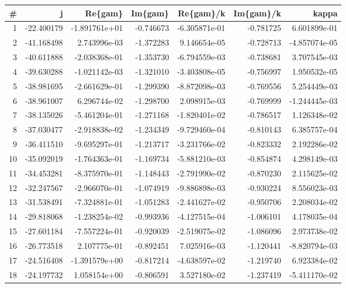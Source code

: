 \begin{tabular}{rrrrrrr}
\toprule
 \# &          j &       Re\{gam\} &   Im\{gam\} &     Re\{gam\}/k &  Im\{gam\}/k &         kappa \\
\midrule
 1 & -22.400179 & -1.891761e+01 & -0.746673 & -6.305871e-01 &  -0.781725 &  6.601899e-01 \\
 2 & -41.168498 &  2.743996e-03 & -1.372283 &  9.146654e-05 &  -0.728713 & -4.857074e-05 \\
 3 & -40.611888 & -2.038368e-01 & -1.353730 & -6.794559e-03 &  -0.738681 &  3.707545e-03 \\
 4 & -39.630288 & -1.021142e-03 & -1.321010 & -3.403808e-05 &  -0.756997 &  1.950532e-05 \\
 5 & -38.981695 & -2.661629e-01 & -1.299390 & -8.872098e-03 &  -0.769556 &  5.254449e-03 \\
 6 & -38.961007 &  6.296744e-02 & -1.298700 &  2.098915e-03 &  -0.769999 & -1.244445e-03 \\
 7 & -38.135026 & -5.461204e-01 & -1.271168 & -1.820401e-02 &  -0.786517 &  1.126348e-02 \\
 8 & -37.030477 & -2.918838e-02 & -1.234349 & -9.729460e-04 &  -0.810143 &  6.385757e-04 \\
 9 & -36.411510 & -9.695297e-01 & -1.213717 & -3.231766e-02 &  -0.823332 &  2.192286e-02 \\
10 & -35.092019 & -1.764363e-01 & -1.169734 & -5.881210e-03 &  -0.854874 &  4.298149e-03 \\
11 & -34.453281 & -8.375970e-01 & -1.148443 & -2.791990e-02 &  -0.870230 &  2.115625e-02 \\
12 & -32.247567 & -2.966070e-01 & -1.074919 & -9.886898e-03 &  -0.930224 &  8.556023e-03 \\
13 & -31.538491 & -7.324881e-01 & -1.051283 & -2.441627e-02 &  -0.950706 &  2.208034e-02 \\
14 & -29.818068 & -1.238254e-02 & -0.993936 & -4.127515e-04 &  -1.006101 &  4.178035e-04 \\
15 & -27.601184 & -7.557224e-01 & -0.920039 & -2.519075e-02 &  -1.086096 &  2.973738e-02 \\
16 & -26.773518 &  2.107775e-01 & -0.892451 &  7.025916e-03 &  -1.120441 & -8.820794e-03 \\
17 & -24.516408 & -1.391579e+00 & -0.817214 & -4.638597e-02 &  -1.219740 &  6.923384e-02 \\
18 & -24.197732 &  1.058154e+00 & -0.806591 &  3.527180e-02 &  -1.237419 & -5.411170e-02 \\

\end{tabular}
